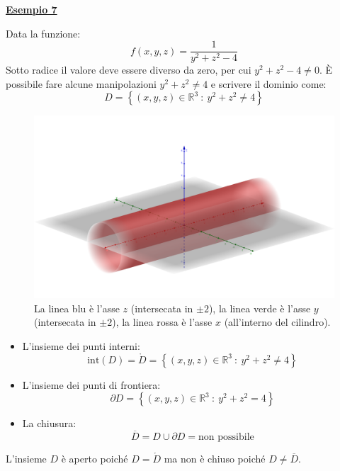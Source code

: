 \documentclass[a4paper]{article}
\newcommand{\example}[1]{\textcolor{Green4}{\textbf{#1}}}
\begin{document}
	\begin{flushleft}
		\example{\underline{Esempio 7}}
	\end{flushleft}

	\noindent
	Data la funzione:
	\begin{equation*}
		f\left(x,y,z\right) = \dfrac{1}{y^{2} + z^{2} - 4}
	\end{equation*}
	Sotto radice il valore deve essere diverso da zero, per cui $y^{2} + z^{2} - 4 \ne 0$. È possibile fare alcune manipolazioni $y^{2} + z^{2} \ne 4$ e scrivere il dominio come:
	\begin{equation*}
		D = \left\{\left(x,y,z\right) \in \mathbb{R}^{3} \: : \: y^{2} + z^{2} \ne 4\right\}
	\end{equation*}
	\begin{figure}[!htp]
		\centering
		\includegraphics[width=\textwidth]{img/dominio_di_funzioni-7.png}
		\caption*{La linea blu è l'asse $z$ (intersecata in $\pm 2$), la linea verde è l'asse $y$ (intersecata in $\pm 2$), la linea rossa è l'asse $x$ (all'interno del cilindro).}
	\end{figure}
	\begin{itemize}
		\item L'insieme dei punti interni:
		\begin{equation*}
			\mathrm{int}\left(D\right) = \mathring{D} = \left\{\left(x,y,z\right) \in \mathbb{R}^{3} \: : \: y^{2} + z^{2} \ne 4 \right\}
		\end{equation*}

		\item L'insieme dei punti di frontiera:
		\begin{equation*}
			\partial D = \left\{\left(x,y,z\right) \in \mathbb{R}^{3} \: : \: y^{2} + z^{2} = 4\right\}
		\end{equation*}

		\item La chiusura:
		\begin{equation*}
			\overline{D} = D \cup \partial D = \text{non possibile}
		\end{equation*}
	\end{itemize}
	L'insieme $D$ è aperto poiché $D = \mathring{D}$ ma non è chiuso poiché $D \ne \overline{D}$.\newpage
\end{document}
